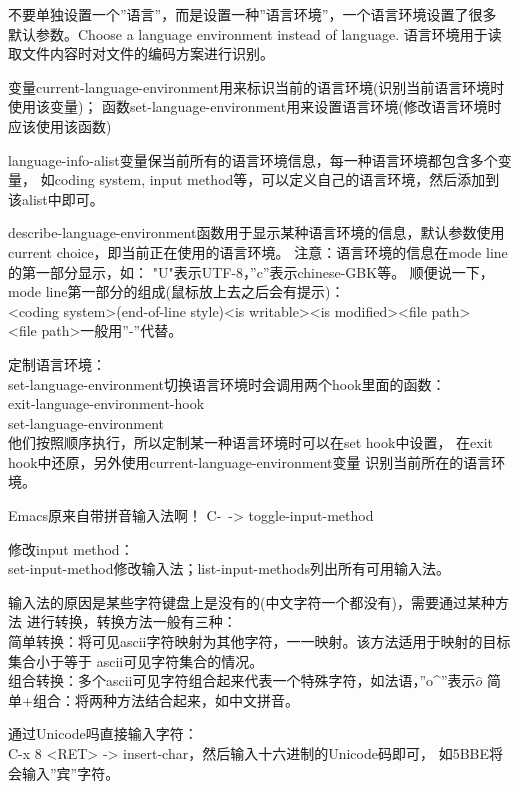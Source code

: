 ﻿\documentclass[a4paper,11pt]{article}
\begin{document}
  不要单独设置一个''语言''，而是设置一种''语言环境''，一个语言环境设置了很多
  默认参数。Choose a language environment instead of language.
  语言环境用于读取文件内容时对文件的编码方案进行识别。
  
  变量current-language-environment用来标识当前的语言环境(识别当前语言环境时使用该变量)；
  函数set-language-environment用来设置语言环境(修改语言环境时应该使用该函数)

  language-info-alist变量保当前所有的语言环境信息，每一种语言环境都包含多个变量，
  如coding system, input method等，可以定义自己的语言环境，然后添加到该alist中即可。
  
  describe-language-environment函数用于显示某种语言环境的信息，默认参数使用
  current choice，即当前正在使用的语言环境。
  注意：语言环境的信息在mode line的第一部分显示，如：
  "U"表示UTF-8，''c''表示chinese-GBK等。
  顺便说一下，mode line第一部分的组成(鼠标放上去之后会有提示)：\\
  <coding system>(end-of-line style)<is writable><is modified><file path>\\
  <file path>一般用''-''代替。

  定制语言环境：\\
  set-language-environment切换语言环境时会调用两个hook里面的函数：\\
  exit-language-environment-hook\\
  set-language-environment\\
  他们按照顺序执行，所以定制某一种语言环境时可以在set hook中设置，
  在exit hook中还原，另外使用current-language-environment变量
  识别当前所在的语言环境。

  Emacs原来自带拼音输入法啊！ C-\ -> toggle-input-method

  修改input method：\\
  set-input-method修改输入法；list-input-methods列出所有可用输入法。
  
  输入法的原因是某些字符键盘上是没有的(中文字符一个都没有)，需要通过某种方法
  进行转换，转换方法一般有三种：\\
  简单转换：将可见ascii字符映射为其他字符，一一映射。该方法适用于映射的目标集合小于等于
  ascii可见字符集合的情况。\\
  组合转换：多个ascii可见字符组合起来代表一个特殊字符，如法语，''o\^{}''表示$\hat{o}$
  简单+组合：将两种方法结合起来，如中文拼音。

  通过Unicode吗直接输入字符：\\
  C-x 8 <RET> -> insert-char，然后输入十六进制的Unicode码即可，
  如5BBE将会输入''宾''字符。
\end{document}

